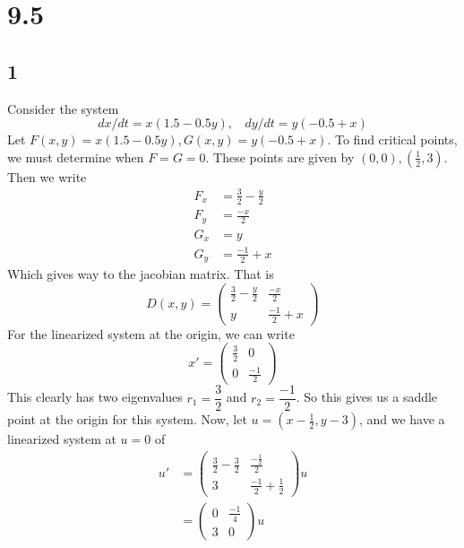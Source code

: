 \documentclass{article}
\theoremstyle{definition}
\begin{document}
\section*{9.5}
    \subsection*{1}
        Consider the system
        \[
            dx / dt = x(1.5 - 0.5y), \ \ \ \ dy/dt = y(-0.5+x)
        \]  
        Let $F(x,y) = x(1.5 - 0.5y), G(x,y) = y(-0.5+x)$.
        To find critical points, we must determine when $F = G = 0$.
        These points are given by $(0,0), (\frac{1}{2}, 3)$.
        Then we write 
        \begin{align*}
            F_x &= \frac{3}{2} - \frac{y}{2} \\
            F_y &= \frac{-x}{2} \\ 
            G_x &= y \\
            G_y &= \frac{-1}{2} + x
        \end{align*}
        Which gives way to the jacobian matrix. That is 
        \[
            D(x,y) = \begin{pmatrix}
                \frac{3}{2} - \frac{y}{2} & \frac{-x}{2} \\
                y & \frac{-1}{2} + x
            \end{pmatrix}   
        \]
        For the linearized system at the origin, we can write
        \[
            x' = \begin{pmatrix}
                \frac{3}{2} & 0 \\
                0 & \frac{-1}{2}
            \end{pmatrix}   
        \]
        This clearly has two eigenvalues $r_1 = \dfrac{3}{2}$ and $r_2 = \dfrac{-1}{2}$.
        So this gives us a saddle point at the origin for this system. 
        Now, let $u = (x - \frac{1}{2}, y - 3)$, and we have a linearized system at $u = 0$
        of 
        \begin{align*}
            u' &= \begin{pmatrix}
                \frac{3}{2} - \frac{3}{2} & \frac{-\frac{1}{2}}{2} \\
                3 & \frac{-1}{2} + \frac{1}{2}
            \end{pmatrix} u \\
            &= \begin{pmatrix}
                0 & \frac{-1}{4} \\
                3 & 0
            \end{pmatrix} u
        \end{align*}
\end{document}
